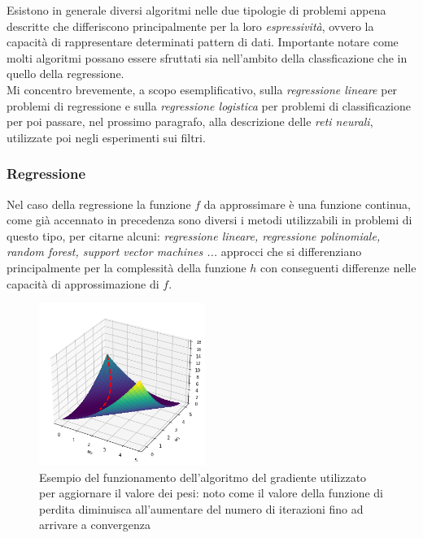 \documentclass[../../main.tex]{subfiles}
\begin{document}
    Esistono in generale diversi algoritmi nelle due tipologie di problemi appena descritte che differiscono principalmente per la loro \textit{espressività}, ovvero la capacità di rappresentare determinati pattern di dati. Importante notare come molti algoritmi possano essere sfruttati sia nell'ambito della classficazione che in quello della regressione.\\
    Mi concentro brevemente, a scopo esemplificativo, sulla \textit{regressione lineare} per problemi di regressione e sulla \textit{regressione logistica} per problemi di classificazione per poi passare, nel prossimo paragrafo, alla descrizione delle \textit{reti neurali}, utilizzate poi negli esperimenti sui filtri.

    \subsubsection{Regressione}

    Nel caso della regressione la funzione $f$ da approssimare è una funzione continua, come già accennato in precedenza sono diversi i metodi utilizzabili in problemi di questo tipo, per citarne alcuni: \textit{regressione lineare, regressione polinomiale, random forest, support vector machines ...} approcci che si differenziano principalmente per la complessità della funzione $h$ con conseguenti differenze nelle capacità di approssimazione di $f$.

    \begin{figure}
        \begin{center}
            \includegraphics[width = 0.48\textwidth]{immagini/4_1/loss_function.png}
        \end{center}
        \caption{Esempio del funzionamento dell'algoritmo del gradiente utilizzato per aggiornare il valore dei pesi: noto come il valore della funzione di perdita diminuisca all'aumentare del numero di iterazioni fino ad arrivare a convergenza}
        \label{fig:gradient_descent}
    \end{figure}
\end{document}
